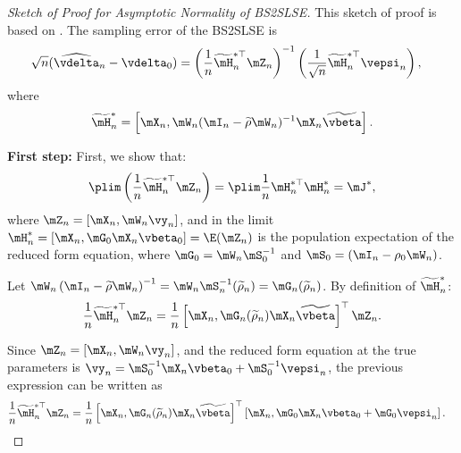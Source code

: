 \documentclass[english,12pt]{book}\usepackage[]{graphicx}\usepackage[]{xcolor}
\begin{document}
\begin{proof}[Sketch of Proof for Asymptotic Normality of BS2SLSE]
This sketch of proof is based on \cite{lee2003best}. The sampling error of the BS2SLSE is
\begin{equation}\label{eq:asy_2sls_pr2}
\begin{aligned}
\sqrt{n}(\widehat{\vdelta}_{n} - \vdelta_0) & = \left(\frac{1}{n}\widetilde{\mH}^{*\top}_n \mZ_n\right)^{-1}\left(\frac{1}{\sqrt{n}}\widetilde{\mH}^{*\top}_n\vepsi_n\right),
\end{aligned}
\end{equation}
%
where 
\begin{equation*}
\widetilde{\mH}^{*}_n =\left[\mX_n, \mW_n(\mI_n - \widetilde{\rho}\mW_n)^{-1}\mX_n\widetilde{\vbeta}\right].
\end{equation*}

\textbf{First step:} First, we show that:
\begin{equation*}
\plim \left(\frac{1}{n}\widetilde{\mH}^{*\top}_n \mZ_n\right)=\plim \frac{1}{n}\mH^{*\top}_n\mH_n^* = \mJ^*, 
\end{equation*}
%
where $\mZ_n = \left[\mX_n, \mW_n\vy_n\right]$, and in the limit $\mH^{*}_n = \left[\mX_n, \mG_0 \mX_n\vbeta_0\right] = \E(\mZ_n)$ is the population expectation of the reduced form equation, where $\mG_0 = \mW_n\mS_0^{-1}$ and $\mS_0 = \left(\mI_n - \rho_0\mW_n\right)$.

Let $\mW_n\left(\mI_n - \widetilde{\rho}\mW_n\right)^{-1} = \mW_n\mS_n^{-1}(\widetilde{\rho}_n) = \mG_n(\widetilde{\rho}_n)$. By definition of $\widetilde{\mH}^{*}_n$:
\begin{equation*}
  \frac{1}{n}\widetilde{\mH}^{*\top}_n \mZ_n = \frac{1}{n}\left[\mX_n, \mG_n(\widetilde{\rho}_n)\mX_n\widetilde{\vbeta}\right]^\top\mZ_n. 
\end{equation*}

Since $\mZ_n = \left[\mX_n, \mW_n\vy_n\right]$, and the reduced form equation at the true parameters is $\vy_n = \mS_0^{-1}\mX_n\vbeta_0 + \mS_0^{-1}\vepsi_n$, the previous expression can be written as
\begin{equation*}
\begin{aligned}
\frac{1}{n}\widetilde{\mH}^{*\top}_n \mZ_n & = \frac{1}{n}\left[\mX_n, \mG_n(\widetilde{\rho}_n)\mX_n\widetilde{\vbeta}\right]^\top\left[\mX_n, \mG_0\mX_n\vbeta_0 + \mG_0\vepsi_n\right].
\end{aligned}
\end{equation*}


\end{proof}
\end{document}
